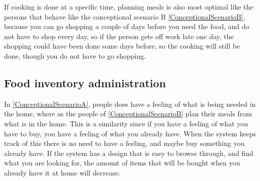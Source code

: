 If cooking is done at a specific time, planning meals is also most optimal like the persons that behave like the conceptional scenario B \ref{ConceptionalScenarioB}, because you can go shopping a couple of days before you need the food, and do not have to shop every day, so if the person gets off work late one day, the shopping could have been done some days before, so the cooking will still be done, though you do not have to go shopping.

\subsection{Food inventory administration}

In \ref{ConceptionalScenarioA}, people does have a feeling of what is being needed in the home, where as the people of \ref{ConceptionalScenarioB} plan their meals from what is in the home. This is a similarity since if you have a feeling of what you have to buy, you have a feeling of what you already have. When the system keeps track of this there is no need to have a feeling, and maybe buy something you already have. If the system has a design that is easy to browse through, and find what you are looking for, the amount of items that will be bought when you already have it at home will decrease.
